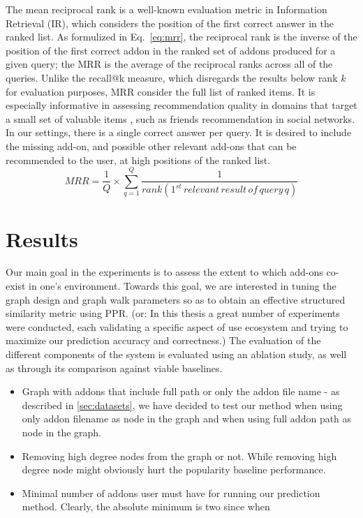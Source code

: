 \documentclass[11pt,oneside]{book}
\let\Oldsection\section
\renewcommand{\section}{\FloatBarrier\Oldsection}
\begin{document}
The mean reciprocal rank \citep{voorhees1999trec} is a
well-known evaluation metric in Information Retrieval (IR), which considers the position of the first correct
answer in the ranked list.  As formulized in Eq.~\eqref{eq:mrr}, the reciprocal rank is the inverse of the position of the first correct addon in the ranked set of addons produced for a given query; the MRR is the average of the reciprocal ranks across all of the queries. Unlike the recall@k measure, which disregards the results below rank $k$ for evaluation purposes, MRR consider the full list of ranked items. It is especially informative in assessing recommendation quality in domains that target a small set of valuable items \citep{chen2006less}, such as friends recommendation in social
networks. In our settings, there is a single correct answer per query. It is desired to include the missing add-on, and possible other relevant add-ons that can be recommended to the user, at high positions of the ranked list.
\begin{equation}
 MRR = \frac{1}{Q} \times \displaystyle\sum\limits_{q=1}^{Q} \frac{1}{rank(1^{st} \, relevant \, result \, of \, query \, q)}
\label{eq:mrr}
\end{equation}


\section{Results}

Our main goal in the experiments is to assess the extent to which add-ons co-exist in one's environment. 
Towards this goal, we are interested in tuning the graph design and graph walk parameters so as to obtain an effective structured similarity metric using PPR. (or: In this thesis a great number of experiments were conducted, each
validating a specific aspect of use ecosystem and trying to maximize
our prediction accuracy and correctness.) The evaluation of the different components of the system is evaluated using an ablation study, as well as through its comparison against viable baselines.  

\begin{itemize}
\renewcommand{\labelitemiii}{$\diamond$}
\item Graph with addons that include full path or only the addon file
  name - as described in \autoref{sec:datasets}, we have decided to
  test our method when using only addon filename as node in the graph
  and when using full addon path as node in the graph.
\item Removing high degree nodes from the graph or not. While removing
  high degree node might obviously hurt the popularity baseline
  performance.
\item Minimal number of addons user must have for running our
  prediction method. Clearly, the absolute minimum is two since when
\end{itemize}
\end{document}
